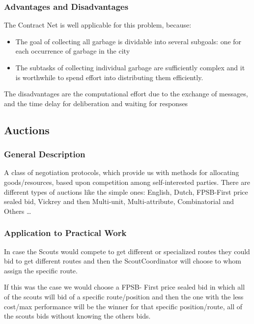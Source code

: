 \subsubsection{Advantages and Disadvantages}

The Contract Net is well applicable for this problem, because:

\begin{itemize}
	\item The goal of collecting all garbage is dividable into several subgoals: one for each occurrence of garbage in the city
	\item The subtasks of collecting individual garbage are sufficiently complex and it is worthwhile to spend effort into distributing them efficiently. 
\end{itemize}

The disadvantages are the computational effort due to the exchange of messages, and the time delay for deliberation and waiting for responses 



\subsection{Auctions}

\subsubsection{General Description}

A class of negotiation protocols, which provide us with methods for allocating goods/resources, based upon competition among self-interested parties.
There are different types of auctions like the simple ones: English, Dutch, FPSB-First price sealed bid, Vickrey and then Multi-unit, Multi-attribute, Combinatorial and Others …

\subsubsection{Application to Practical Work}

In case the Scouts would compete to get different or specialized routes they could bid to get different routes and then the ScoutCoordinator will choose to whom assign the specific route.

If this was the case we would choose a FPSB- First price sealed bid in which all of the scouts will bid of a specific route/position and then the one with the less cost/max performance will be the winner for that specific position/route, all of the scouts bids without knowing the others bids.

